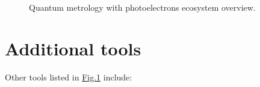 \documentclass[letterpaper,table,10pt,english]{jupyterBook}
\begin{document}
\begin{figure}[htbp]
\centering
\capstart

\noindent{}
\caption{Quantum metrology with photoelectrons ecosystem overview.}\label{\detokenize{part1/platform_intro_071122:qm-platform-diag}}\end{figure}


\section{Additional tools}
\label{\detokenize{part1/platform_intro_071122:additional-tools}}\label{\detokenize{part1/platform_intro_071122:sect-platform-othertools}}
\sphinxAtStartPar
Other tools listed in \hyperref[\detokenize{part1/platform_intro_071122:qm-platform-diag}]{Fig.\@ \ref{\detokenize{part1/platform_intro_071122:qm-platform-diag}}} include:
\end{document}
